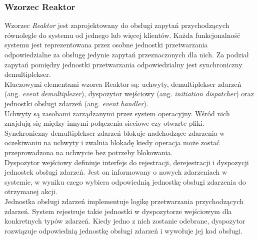 \documentclass[12pt,twoside]{article}
\begin{document}
\subsubsection{Wzorzec Reaktor}\label{wzorzec-reaktor}

Wzorzec \emph{Reaktor} jest zaprojektowany do obsługi zapytań
przychodzących równolegle do systemu od jednego lub więcej klientów.
Każda funkcjonalność systemu jest reprezentowana przez osobne jednostki
przetwarzania odpowiedzialne za obsługę jedynie zapytań przeznaczonych
dla nich. Za podział zapytań pomiędzy jednostki przetwarzania
odpowiedzialny jest synchroniczny demultiplekser.\\
Kluczowymi elementami wzorca Reaktor są: uchwyty, demultiplekser zdarzeń
(ang. \emph{event demultiplexer}), dyspozytor wejściowy (ang.
\emph{initiation dispatcher}) oraz jednostki obsługi zdarzeń (ang.
\emph{event handler}).\\
Uchwyty są zasobami zarządzanymi przez system operacyjny. Wśród nich
znajdują się między innymi połączenia sieciowe czy otwarte pliki.\\
Synchroniczny demultiplekser zdarzeń blokuje nadchodzące zdarzenia w
oczekiwaniu na uchwyty i zwalnia blokadę kiedy operacja może zostać
przeprowadzona na uchwycie bez potrzeby blokowania.\\
Dyspozytor wejściowy definiuje interfejs do rejestracji, derejestracji i
dyspozycji jednostek obsługi zdarzeń. Jest on informowany o nowych
zdarzeniach w systemie, w wyniku czego wybiera odpowiednią jednostkę
obsługi zdarzenia do otrzymanej akcji.\\
Jednostka obsługi zdarzeń implementuje logikę przetwarzania
przychodzących zdarzeń. System rejestruje takie jednostki w dyspozytorze
wejściowym dla konkretnych typów zdarzeń. Kiedy jedno z nich zostanie
odebrane, dyspozytor rozwiązuje odpowiednią jednostkę obsługi zdarzeń i
wywołuje jej kod obsługi.
\end{document}
